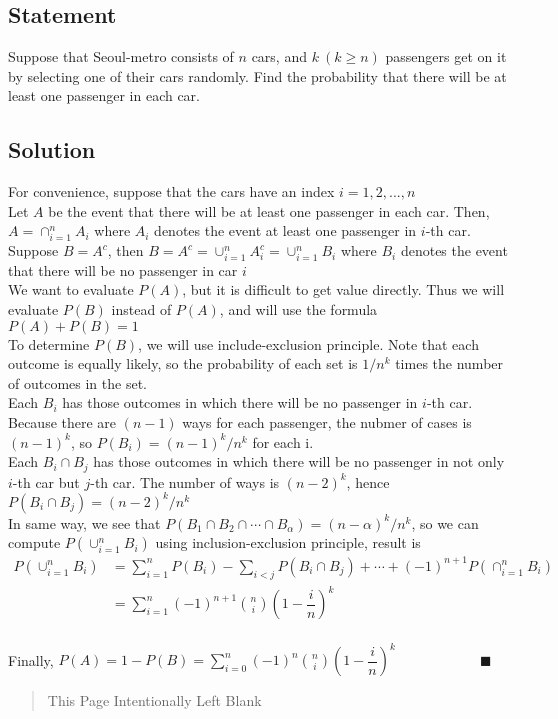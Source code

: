 \documentclass[12pt]{article}
\theoremstyle{plain}
\renewcommand{\qedsymbol}{\ensuremath{\blacksquare}}
\begin{document}
\subsection*{Statement}
Suppose that Seoul-metro consists of $n$ cars, and $k\ (k\geq n)$ passengers get on it by selecting one of their cars randomly. Find the probability that there will be at least one passenger in each car.
\subsection*{Solution}
For convenience, suppose that the cars have an index $i=1,2,...,n$
\\Let $A$ be the event that there will be at least one passenger in each car. Then, $A=\cap_{i=1}^n A_i$ where $A_i$ denotes the event at least one passenger in $i$-th car.
\\ Suppose $B=A^c$, then $B=A^c=\cup_{i=1}^n A_i^c=\cup_{i=1}^n B_i$ where $B_i$ denotes the event that there will be no passenger in car $i$
\\ We want to evaluate $P\left(A\right)$, but it is difficult to get value directly. Thus we will evaluate $P(B)$ instead of $P(A)$, and will use the formula $P(A)+P(B)=1$
\\ To determine $P(B)$, we will use include-exclusion principle. Note that each outcome is equally likely, so the probability of each set is $1/{n^k}$ times the number of outcomes in the set.
\\ Each $B_i$ has those outcomes in which there will be no passenger in $i$-th car. Because there are $(n-1)$ ways for each passenger, the nubmer of cases is $(n-1)^k$, so $P(B_i)=(n-1)^k/n^k $ for each i. 
\\ Each $B_i\cap B_j$ has those outcomes in which there will be no passenger in not only $i$-th car but $j$-th car. The number of ways is $(n-2)^k$, hence $P(B_i\cap B_j)=(n-2)^k/n^k$
\\ In same way, we see that $P(B_1\cap B_2\cap \cdots\cap B_\alpha)=(n-\alpha)^k/n^k$, so we can compute $P(\cup_{i=1}^n B_i)$ using inclusion-exclusion principle, result is
$$\begin{aligned}
	P(\cup_{i=1}^n B_i)&=\displaystyle{\sum_{i=1}^{n}P(B_i)}-\displaystyle{\sum_{i<j}P(B_i\cap B_j)+\cdots+(-1)^{n+1}P(\cap_{i=1}^nB_i)}
	\\&=\displaystyle{\sum_{i=1}^{n}(-1)^{n+1}\binom{n}{i}\left(1-\dfrac{i}{n}\right)^k}
\end{aligned}$$
\\Finally, $P(A)=1-P(B)=\displaystyle{\sum_{i=0}^n(-1)^n\binom{n}{i}\left(1-\dfrac{i}{n}\right)^k}\qquad\qquad\qquad\qedsymbol$

\newpage
\vspace*{\fill} 
\begin{quote} 
	\centering 
	This Page Intentionally Left Blank 
\end{quote}
\vspace*{\fill}
\end{document}
